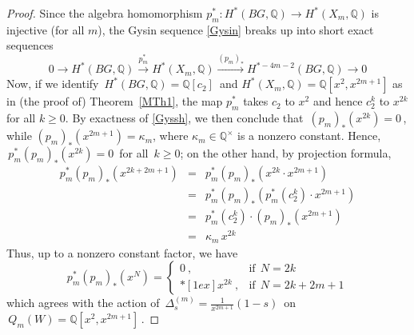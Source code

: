 \documentclass[11pt]{amsart}
\theoremstyle{definition}
\theoremstyle{remark}
\numberwithin{equation}{section}
\newcommand{\la}{\label}
\def\Q{\mathbb{Q}}
\begin{document}
\begin{proof}
Since the algebra homomorphism $ p_m^*: H^*(BG, \Q) \to H^*(X_m, \Q) $ is injective (for all $m$),
the Gysin sequence \eqref{Gysin} breaks up into short exact sequences
%
\begin{equation}
\la{Gyssh}
0 \to H^*(BG, \Q) \xrightarrow{p_m^*} H^*(X_m, \Q) \xrightarrow{(p_m)_*} H^{*-4m-2}(BG, \Q) \to 0
\end{equation}
%
Now, if we identify $\,H^*(BG, \Q) = \Q[c_2]\,$ and $ H^*(X_m, \Q) = \Q[x^2, x^{2m+1}] $
as in (the proof of) Theorem~\ref{MTh1}, the map $ p_m^*$ takes $ c_2 $ to $ x^2 $ and hence
$ c_2^k $ to $ x^{2k} $ for all $ k \ge 0 $. By exactness of \eqref{Gyssh}, we then conclude that
$\,(p_m)_*(x^{2k}) = 0 \,$, while $ (p_m)_*(x^{2m+1}) = \kappa_m $, where $ \kappa_m \in \Q^{\times}$
is a nonzero constant. Hence, $\, p_m^* (p_m)_*(x^{2k}) = 0 \,$ for all $\, k \ge 0 $; on the other hand, by projection formula,
%
\begin{eqnarray*}
p_m^* (p_m)_*(x^{2k+2m+1}) &=& p_m^* (p_m)_*(x^{2k} \cdot x^{2m+1}) \\
&=& p_m^* (p_m)_*(p_m^*(c_2^k) \cdot x^{2m+1}) \\
&=& p_m^*(c_2^k) \cdot (p_m)_*(x^{2m+1})\\
&=& \kappa_m \,x^{2k}
\end{eqnarray*}
%
Thus, up to a nonzero constant factor, we have
%
$$
p_m^* (p_m)_*(x^N) =
\left\{
\begin{array}{ll}
0\ ,& \mbox{if}\ \ N = 2k  \\*[1ex]
x^{2k}\ , & \mbox{if}\ \ N = 2k+2m+1
\end{array}
\right.
$$
%
which agrees with the action of $\, \Delta_s^{(m)} = \frac{1}{x^{2m+1}}(1-s)\,$ on $\, Q_m(W) = \Q[x^2, x^{2m+1}]\,$.
\end{proof}
%
\end{document}
